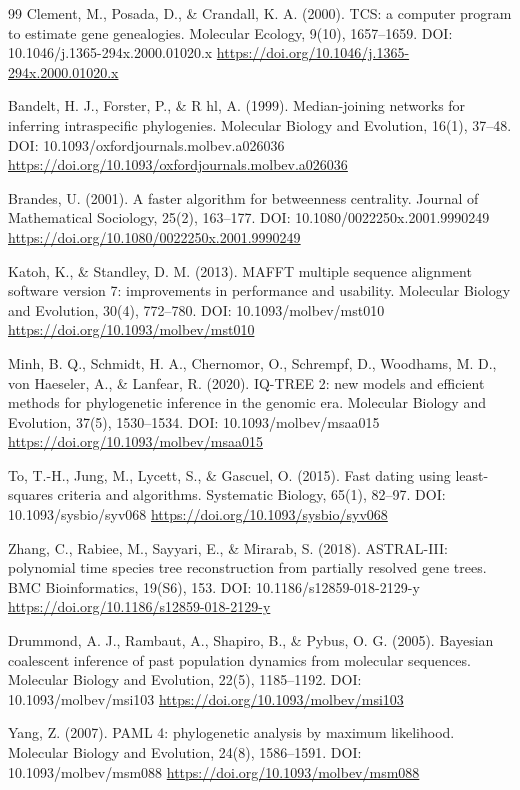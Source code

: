 \documentclass[11pt]{article}
\begin{document}
\begin{thebibliography}{99}
Clement, M., Posada, D., \& Crandall, K. A. (2000). TCS: a computer program to estimate gene genealogies. Molecular Ecology, 9(10), 1657--1659. DOI: 10.1046/j.1365-294x.2000.01020.x \url{https://doi.org/10.1046/j.1365-294x.2000.01020.x}

Bandelt, H. J., Forster, P., \& R hl, A. (1999). Median-joining networks for inferring intraspecific phylogenies. Molecular Biology and Evolution, 16(1), 37--48. DOI: 10.1093/oxfordjournals.molbev.a026036 \url{https://doi.org/10.1093/oxfordjournals.molbev.a026036}

Brandes, U. (2001). A faster algorithm for betweenness centrality. Journal of Mathematical Sociology, 25(2), 163--177. DOI: 10.1080/0022250x.2001.9990249 \url{https://doi.org/10.1080/0022250x.2001.9990249}

Katoh, K., \& Standley, D. M. (2013). MAFFT multiple sequence alignment software version 7: improvements in performance and usability. Molecular Biology and Evolution, 30(4), 772--780. DOI: 10.1093/molbev/mst010 \url{https://doi.org/10.1093/molbev/mst010}

Minh, B. Q., Schmidt, H. A., Chernomor, O., Schrempf, D., Woodhams, M. D., von Haeseler, A., \& Lanfear, R. (2020). IQ-TREE 2: new models and efficient methods for phylogenetic inference in the genomic era. Molecular Biology and Evolution, 37(5), 1530--1534. DOI: 10.1093/molbev/msaa015 \url{https://doi.org/10.1093/molbev/msaa015}

To, T.-H., Jung, M., Lycett, S., \& Gascuel, O. (2015). Fast dating using least-squares criteria and algorithms. Systematic Biology, 65(1), 82--97. DOI: 10.1093/sysbio/syv068 \url{https://doi.org/10.1093/sysbio/syv068}

Zhang, C., Rabiee, M., Sayyari, E., \& Mirarab, S. (2018). ASTRAL-III: polynomial time species tree reconstruction from partially resolved gene trees. BMC Bioinformatics, 19(S6), 153. DOI: 10.1186/s12859-018-2129-y \url{https://doi.org/10.1186/s12859-018-2129-y}

Drummond, A. J., Rambaut, A., Shapiro, B., \& Pybus, O. G. (2005). Bayesian coalescent inference of past population dynamics from molecular sequences. Molecular Biology and Evolution, 22(5), 1185--1192. DOI: 10.1093/molbev/msi103 \url{https://doi.org/10.1093/molbev/msi103}

Yang, Z. (2007). PAML 4: phylogenetic analysis by maximum likelihood. Molecular Biology and Evolution, 24(8), 1586--1591. DOI: 10.1093/molbev/msm088 \url{https://doi.org/10.1093/molbev/msm088}


\end{thebibliography}
\end{document}
